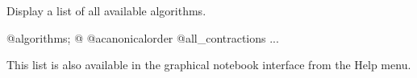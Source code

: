 
Display a list of all available algorithms.
\begin{screen}{1}
@algorithms;
@
@acanonicalorder
@all_contractions
...
\end{screen}
This list is also available in the graphical notebook interface from
the Help menu.



